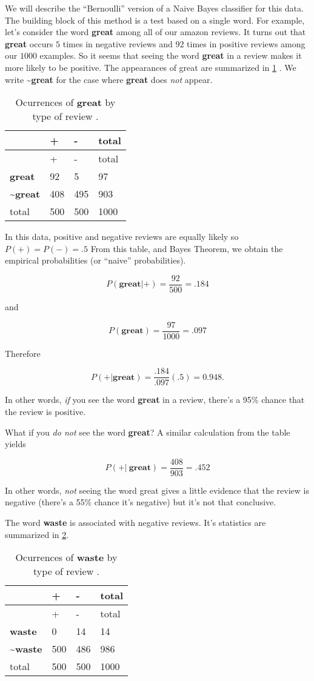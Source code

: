 \documentclass[
]{article}
\begin{document}
We will describe the ``Bernoulli'' version of a Naive Bayes classifier
for this data. The building block of this method is a test based on a
single word. For example, let's consider the word \textbf{great} among
all of our amazon reviews. It turns out that \textbf{great} occurs \(5\)
times in negative reviews and \(92\) times in positive reviews among our
\(1000\) examples. So it seems that seeing the word \textbf{great} in a
review makes it more likely to be positive. The appearances of great are
summarized in \cref{tbl:great} . We write \textbf{\textasciitilde great}
for the case where \textbf{great} does \emph{not} appear.

\begin{longtable}[]{@{}llll@{}}
\caption{Ocurrences of \textbf{great} by type of review
.\label{tbl:great}}\tabularnewline
\toprule
& + & - & total\tabularnewline
\midrule
\endfirsthead
\toprule
& + & - & total\tabularnewline
\midrule
\endhead
\textbf{great} & 92 & 5 & 97\tabularnewline
\textasciitilde{}\textbf{great} & 408 & 495 & 903\tabularnewline
total & 500 & 500 & 1000\tabularnewline
\bottomrule
\end{longtable}

In this data, positive and negative reviews are equally likely so
\(P(+)=P(-)=.5\) From this table, and Bayes Theorem, we obtain the
empirical probabilities (or ``naive'' probabilities).

\[
P(\mathbf{great} | +) = \frac{92}{500} = .184
\]

and

\[
P(\mathbf{great}) = \frac{97}{1000} = .097
\]

Therefore

\[
P(+|\mathbf{great}) = \frac{.184}{.097}(.5) = 0.948.
\]

In other words, \emph{if} you see the word \textbf{great} in a review,
there's a 95\% chance that the review is positive.

What if you \emph{do not} see the word \textbf{great}? A similar
calculation from the table yields

\[
P(+|\mathbf{~great}) = \frac{408}{903} = .452
\]

In other words, \emph{not} seeing the word great gives a little evidence
that the review is negative (there's a 55\% chance it's negative) but
it's not that conclusive.

The word \textbf{waste} is associated with negative reviews. It's
statistics are summarized in \cref{tbl:waste}.

\begin{longtable}[]{@{}llll@{}}
\caption{Ocurrences of \textbf{waste} by type of review
.\label{tbl:waste}}\tabularnewline
\toprule
& + & - & total\tabularnewline
\midrule
\endfirsthead
\toprule
& + & - & total\tabularnewline
\midrule
\endhead
\textbf{waste} & 0 & 14 & 14\tabularnewline
\textasciitilde{}\textbf{waste} & 500 & 486 & 986\tabularnewline
total & 500 & 500 & 1000\tabularnewline
\bottomrule
\end{longtable}
\end{document}
